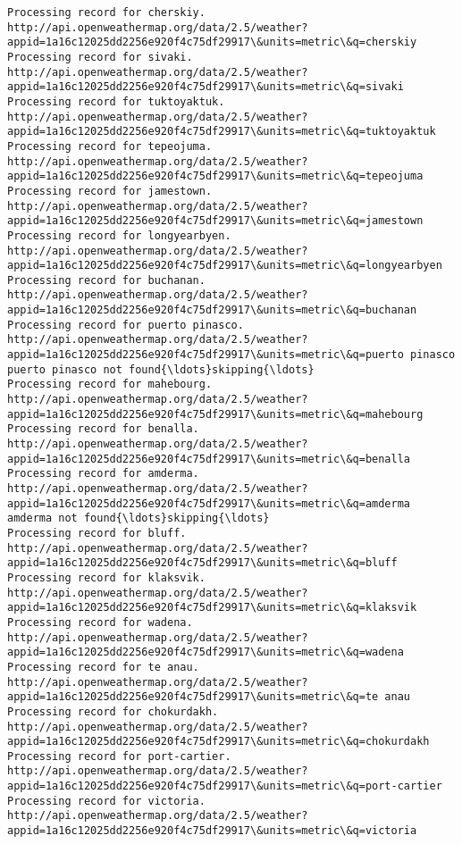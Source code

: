 \documentclass[11pt]{article}
\begin{document}
\begin{Verbatim}[commandchars=\\\{\}]
Processing record for cherskiy.
http://api.openweathermap.org/data/2.5/weather?appid=1a16c12025dd2256e920f4c75df29917\&units=metric\&q=cherskiy
Processing record for sivaki.
http://api.openweathermap.org/data/2.5/weather?appid=1a16c12025dd2256e920f4c75df29917\&units=metric\&q=sivaki
Processing record for tuktoyaktuk.
http://api.openweathermap.org/data/2.5/weather?appid=1a16c12025dd2256e920f4c75df29917\&units=metric\&q=tuktoyaktuk
Processing record for tepeojuma.
http://api.openweathermap.org/data/2.5/weather?appid=1a16c12025dd2256e920f4c75df29917\&units=metric\&q=tepeojuma
Processing record for jamestown.
http://api.openweathermap.org/data/2.5/weather?appid=1a16c12025dd2256e920f4c75df29917\&units=metric\&q=jamestown
Processing record for longyearbyen.
http://api.openweathermap.org/data/2.5/weather?appid=1a16c12025dd2256e920f4c75df29917\&units=metric\&q=longyearbyen
Processing record for buchanan.
http://api.openweathermap.org/data/2.5/weather?appid=1a16c12025dd2256e920f4c75df29917\&units=metric\&q=buchanan
Processing record for puerto pinasco.
http://api.openweathermap.org/data/2.5/weather?appid=1a16c12025dd2256e920f4c75df29917\&units=metric\&q=puerto pinasco
puerto pinasco not found{\ldots}skipping{\ldots}
Processing record for mahebourg.
http://api.openweathermap.org/data/2.5/weather?appid=1a16c12025dd2256e920f4c75df29917\&units=metric\&q=mahebourg
Processing record for benalla.
http://api.openweathermap.org/data/2.5/weather?appid=1a16c12025dd2256e920f4c75df29917\&units=metric\&q=benalla
Processing record for amderma.
http://api.openweathermap.org/data/2.5/weather?appid=1a16c12025dd2256e920f4c75df29917\&units=metric\&q=amderma
amderma not found{\ldots}skipping{\ldots}
Processing record for bluff.
http://api.openweathermap.org/data/2.5/weather?appid=1a16c12025dd2256e920f4c75df29917\&units=metric\&q=bluff
Processing record for klaksvik.
http://api.openweathermap.org/data/2.5/weather?appid=1a16c12025dd2256e920f4c75df29917\&units=metric\&q=klaksvik
Processing record for wadena.
http://api.openweathermap.org/data/2.5/weather?appid=1a16c12025dd2256e920f4c75df29917\&units=metric\&q=wadena
Processing record for te anau.
http://api.openweathermap.org/data/2.5/weather?appid=1a16c12025dd2256e920f4c75df29917\&units=metric\&q=te anau
Processing record for chokurdakh.
http://api.openweathermap.org/data/2.5/weather?appid=1a16c12025dd2256e920f4c75df29917\&units=metric\&q=chokurdakh
Processing record for port-cartier.
http://api.openweathermap.org/data/2.5/weather?appid=1a16c12025dd2256e920f4c75df29917\&units=metric\&q=port-cartier
Processing record for victoria.
http://api.openweathermap.org/data/2.5/weather?appid=1a16c12025dd2256e920f4c75df29917\&units=metric\&q=victoria

\end{Verbatim}
\end{document}
